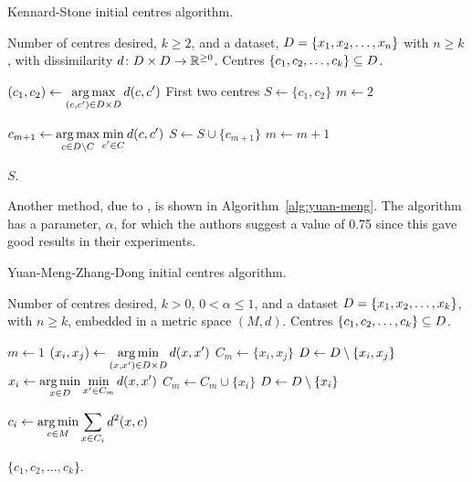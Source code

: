 \begin{algorithm}[h]
  \caption{Kennard-Stone initial centres algorithm.}
  \label{alg:kennard-stone}

  \begin{algorithmic}
    \Require Number of centres desired, $k \geq 2$, and a dataset, $D =
             \{x_1,x_2,\dotsc,x_n\}$ with $n \geq k$, with dissimilarity
             $d \colon D \times D \to \mathbb{R}^{\geq 0}$.
    \Ensure Centres $\{c_1,c_2,\dotsc,c_k\} \subseteq D$.

    \State $\displaystyle (c_1,c_2) \gets
            \operatorname*{arg\,max}_{(c,c') \in D \times D} d(c,c')$ \Comment First
            two centres
    \State $S \gets \{c_1,c_2\}$
    \State $m \gets 2$

       \State $\displaystyle c_{m+1} \gets
               \argmax_{c \in \dset \setminus C}
               \min_{\raisebox{-.2em}{$\scriptstyle c' \in C$}} d(c,c')$
       \State $S \gets S \cup \{c_{m+1}\}$
       \State $m \gets m+1$
    \EndWhile

    \State \Return $S$.
  \end{algorithmic}
\end{algorithm}

Another method, due to \citet{yuan04initial}, is shown in
Algorithm~\ref{alg:yuan-meng}.  The algorithm has a parameter, $\alpha$, for
which the authors suggest a value of 0.75 since this gave good results in
their experiments.

\begin{algorithm}[h]
  \caption{Yuan-Meng-Zhang-Dong initial centres algorithm.}
  \label{alg:yuan-meng}

  \begin{algorithmic}
    \Require Number of centres desired, $k > 0$, $0 < \alpha \leq 1$, and a
             dataset $D = \{x_1,x_2,\dotsc,x_k\}$, with $n \geq k$,
             embedded in a metric space $(M,d)$.
    \Ensure Centres $\{c_1,c_2,\dotsc,c_k\} \subseteq D$.

    \State $m \gets 1$
       \State $\displaystyle (x_i,x_j) \gets
               \operatorname*{arg\,min}_{(x,x') \in D \times D} d(x,x')$
       \State $C_m \gets \{x_i,x_j\}$
       \State $D \gets D \setminus \{x_i,x_j\}$
          \State $\displaystyle x_i \gets
                  \operatorname*{arg\,min}_{x \in D} \min_{x' \in C_m} d(x,x')$
          \State $C_m \gets C_m \cup \{x_i\}$
          \State $D \gets D \setminus \{x_i\}$
       \EndWhile
    \EndWhile

       \State $\displaystyle c_i \gets
               \operatorname*{arg\,min}_{c \in M} \sum_{x \in C_i} d^2(x,c)$
    \EndFor

    \State \Return $\{c_1,c_2,\dotsc,c_k\}$.
  \end{algorithmic}
\end{algorithm}

